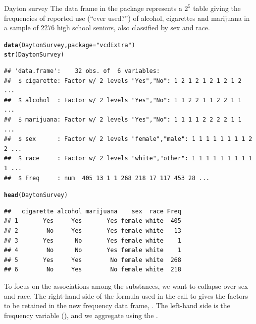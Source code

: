 \documentclass[11pt]{book}\usepackage[]{graphicx}\usepackage[]{color}
\makeatletter
\newcommand{\hlstr}[1]{\textcolor[rgb]{0.192,0.494,0.8}{#1}}%
\newcommand{\hlstd}[1]{\textcolor[rgb]{0.345,0.345,0.345}{#1}}%
\newcommand{\hlkwc}[1]{\textcolor[rgb]{0.333,0.667,0.333}{#1}}%
\newcommand{\hlkwd}[1]{\textcolor[rgb]{0.737,0.353,0.396}{\textbf{#1}}}%
\newenvironment{kframe}{%
 \def\at@end@of@kframe{}%
 \ifinner\ifhmode%
  \def\at@end@of@kframe{\end{minipage}}%
  \begin{minipage}{\columnwidth}%
 \fi\fi%
 \def\FrameCommand##1{\hskip\@totalleftmargin \hskip-\fboxsep
 \colorbox{shadecolor}{##1}\hskip-\fboxsep
     \hskip-\linewidth \hskip-\@totalleftmargin \hskip\columnwidth}%
 \MakeFramed {\advance\hsize-\width
   \@totalleftmargin\z@ \linewidth\hsize
   \@setminipage}}%
 {\par\unskip\endMakeFramed%
 \at@end@of@kframe}
\newenvironment{knitrout}{}{} %
\renewenvironment{knitrout}{\small\renewcommand{\baselinestretch}{.85}}{} %
\makeatother
\begin{document}
\begin{Example}[dayton1]{Dayton survey}
The data frame  in the  package represents a
$2^5$ table giving the frequencies of reported use (``ever used?'') of 
alcohol, cigarettes and marijuana in a sample of 2276 high school seniors,
also classified by sex and race.  

\begin{knitrout}
\color{fgcolor}\begin{kframe}
\begin{alltt}
\hlkwd{data}\hlstd{(DaytonSurvey,} \hlkwc{package}\hlstd{=}\hlstr{"vcdExtra"}\hlstd{)}
\hlkwd{str}\hlstd{(DaytonSurvey)}
\end{alltt}
\begin{verbatim}
## 'data.frame':	32 obs. of  6 variables:
##  $ cigarette: Factor w/ 2 levels "Yes","No": 1 2 1 2 1 2 1 2 1 2 ...
##  $ alcohol  : Factor w/ 2 levels "Yes","No": 1 1 2 2 1 1 2 2 1 1 ...
##  $ marijuana: Factor w/ 2 levels "Yes","No": 1 1 1 1 2 2 2 2 1 1 ...
##  $ sex      : Factor w/ 2 levels "female","male": 1 1 1 1 1 1 1 1 2 2 ...
##  $ race     : Factor w/ 2 levels "white","other": 1 1 1 1 1 1 1 1 1 1 ...
##  $ Freq     : num  405 13 1 1 268 218 17 117 453 28 ...
\end{verbatim}
\begin{alltt}
\hlkwd{head}\hlstd{(DaytonSurvey)}
\end{alltt}
\begin{verbatim}
##   cigarette alcohol marijuana    sex  race Freq
## 1       Yes     Yes       Yes female white  405
## 2        No     Yes       Yes female white   13
## 3       Yes      No       Yes female white    1
## 4        No      No       Yes female white    1
## 5       Yes     Yes        No female white  268
## 6        No     Yes        No female white  218
\end{verbatim}
\end{kframe}
\end{knitrout}


To focus on the associations among the
substances, we want to collapse over sex and race. The right-hand side of the formula
used in the call to  gives the factors to be retained in the
new frequency data frame, .  The left-hand side is
the frequency variable (), and we aggregate using the .


\end{Example}
\end{document}
